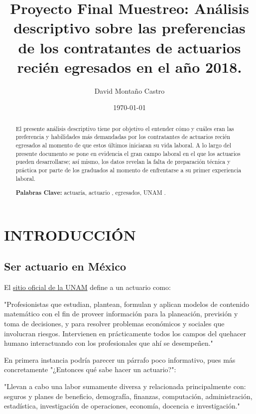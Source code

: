 \documentclass{article}
\title{Proyecto Final Muestreo: Análisis descriptivo sobre las preferencias de los contratantes de actuarios recién egresados en el año 2018. }
\author{David Montaño Castro}
\affil{Facultad de Ciencias, Universidad Nacional Autónoma de México.}
\date{\today}
\begin{document}
\maketitle
\begin{abstract}
    El presente análisis descriptivo tiene por objetivo el entender cómo y cuáles eran las preferencia y habilidades más demandadas por los contratantes de actuarios recién egresados al momento de que estos últimos iniciaran su vida laboral. A lo largo del presente documento se pone en evidencia el gran campo laboral en el que los actuarios pueden desarrollarse; así mismo, los datos revelan la falta de preparación técnica y práctica por parte de los graduados al momento de enfrentarse a su primer experiencia laboral.  
    
    \textbf{Palabras Clave:} actuaría, actuario , egresados, UNAM .
\end{abstract}
\tableofcontents
\newpage




\section{INTRODUCCIÓN}

\subsection{Ser actuario en México}

El \href{http://oferta.unam.mx/actuaria.html}{sitio oficial de la UNAM} define a un actuario como:

\begin{center}
    "Profesionistas que estudian, plantean, formulan y aplican modelos de contenido matemático con el fin de proveer información para la planeación, previsión y toma de decisiones, y para resolver problemas económicos y sociales que involucran riesgos. Intervienen en prácticamente todos los campos del quehacer humano interactuando con los profesionales que ahí se desempeñen."
\end{center}
    
En primera instancia podría parecer un párrafo poco informativo, pues más concretamente "¿Entonces qué sabe hacer un actuario?":

\begin{center}
    "Llevan a cabo una labor sumamente diversa y relacionada principalmente con: seguros y planes de beneficio, demografía, finanzas, computación, administración, estadística, investigación de operaciones, economía, docencia e investigación."
\end{center}
\end{document}
